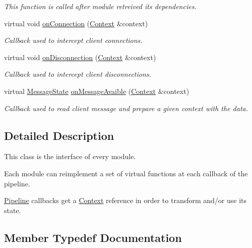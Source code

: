 \begin{DoxyCompactItemize}
\begin{DoxyCompactList}\small\item\em This function is called after module retreived its dependencies. \end{DoxyCompactList}\item 
virtual void \mbox{\hyperlink{classo_z_1_1_i_module_a41527d4435446ad02f815aa0617c6344}{on\+Connection}} (\mbox{\hyperlink{classo_z_1_1_context}{Context}} \&context)
\begin{DoxyCompactList}\small\item\em Callback used to intercept client connections. \end{DoxyCompactList}\item 
virtual void \mbox{\hyperlink{classo_z_1_1_i_module_aa8518b9de8d65dcbbdb383ac6f9ccfc2}{on\+Disconnection}} (\mbox{\hyperlink{classo_z_1_1_context}{Context}} \&context)
\begin{DoxyCompactList}\small\item\em Callback used to intercept client disconnections. \end{DoxyCompactList}\item 
virtual \mbox{\hyperlink{namespaceo_z_aca1addfd2374772c2b5db4bc5a96422c}{Message\+State}} \mbox{\hyperlink{classo_z_1_1_i_module_a241ee86ca88d4733ccea5a530fd1bbc9}{on\+Message\+Avaible}} (\mbox{\hyperlink{classo_z_1_1_context}{Context}} \&context)
\begin{DoxyCompactList}\small\item\em Callback used to read client message and prepare a given context with the data. \end{DoxyCompactList}\end{DoxyCompactItemize}


\subsection{Detailed Description}
This class is the interface of every module. 

Each module can reimplement a set of virtual functions at each callback of the pipeline.

\mbox{\hyperlink{classo_z_1_1_pipeline}{Pipeline}} callbacks get a \mbox{\hyperlink{classo_z_1_1_context}{Context}} reference in order to transform and/or use its state. 

\subsection{Member Typedef Documentation}
\mbox{\label{classo_z_1_1_i_module_ac13210556cb2a65d186bfbe5208c666c}} 
